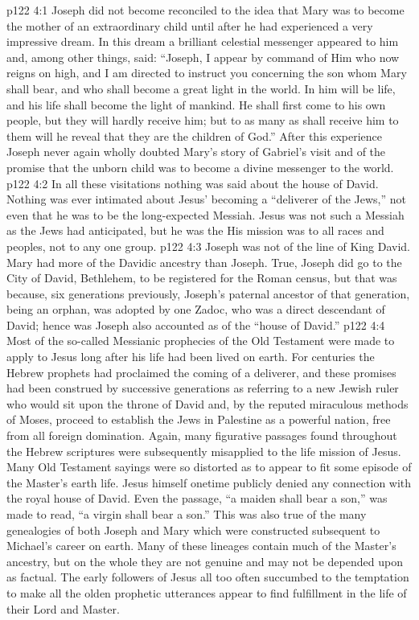 \vs p122 4:1 Joseph did not become reconciled to the idea that Mary was to become the mother of an extraordinary child until after he had experienced a very impressive dream. In this dream a brilliant celestial messenger appeared to him and, among other things, said: “Joseph, I appear by command of Him who now reigns on high, and I am directed to instruct you concerning the son whom Mary shall bear, and who shall become a great light in the world. In him will be life, and his life shall become the light of mankind. He shall first come to his own people, but they will hardly receive him; but to as many as shall receive him to them will he reveal that they are the children of God.” After this experience Joseph never again wholly doubted Mary’s story of Gabriel’s visit and of the promise that the unborn child was to become a divine messenger to the world.
\pc \vs p122 4:2 In all these visitations nothing was said about the house of David. Nothing was ever intimated about Jesus’ becoming a “deliverer of the Jews,” not even that he was to be the long\hyp{}expected Messiah. Jesus was not such a Messiah as the Jews had anticipated, but he was the  His mission was to all races and peoples, not to any one group.
\vs p122 4:3 Joseph was not of the line of King David. Mary had more of the Davidic ancestry than Joseph. True, Joseph did go to the City of David, Bethlehem, to be registered for the Roman census, but that was because, six generations previously, Joseph’s paternal ancestor of that generation, being an orphan, was adopted by one Zadoc, who was a direct descendant of David; hence was Joseph also accounted as of the “house of David.”
\vs p122 4:4 Most of the so\hyp{}called Messianic prophecies of the Old Testament were made to apply to Jesus long after his life had been lived on earth. For centuries the Hebrew prophets had proclaimed the coming of a deliverer, and these promises had been construed by successive generations as referring to a new Jewish ruler who would sit upon the throne of David and, by the reputed miraculous methods of Moses, proceed to establish the Jews in Palestine as a powerful nation, free from all foreign domination. Again, many figurative passages found throughout the Hebrew scriptures were subsequently misapplied to the life mission of Jesus. Many Old Testament sayings were so distorted as to appear to fit some episode of the Master’s earth life. Jesus himself onetime publicly denied any connection with the royal house of David. Even the passage, “a maiden shall bear a son,” was made to read, “a virgin shall bear a son.” This was also true of the many genealogies of both Joseph and Mary which were constructed subsequent to Michael’s career on earth. Many of these lineages contain much of the Master’s ancestry, but on the whole they are not genuine and may not be depended upon as factual. The early followers of Jesus all too often succumbed to the temptation to make all the olden prophetic utterances appear to find fulfillment in the life of their Lord and Master.
